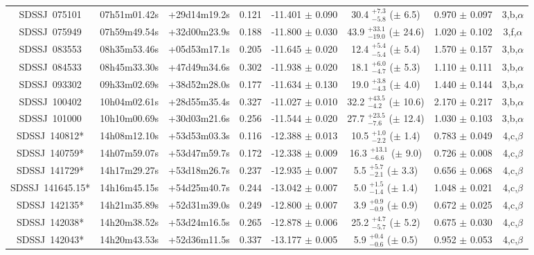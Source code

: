 \documentclass[a4paper,fleqn,usenatbib]{mnras}
\begin{document}
\begin{appendix}
\begin{longtable}{cccccccc}
SDSSJ~075101 & 07h51m01.42s & +29d14m19.2s & 0.121 & -11.401 $\pm$ 0.090 & 30.4 $_{-5.8}^{+7.3}$ ($\pm$ 6.5) &    0.970 $\pm$ 0.097 & 3,b,$\alpha$ \\
SDSSJ~075949 & 07h59m49.54s & +32d00m23.9s & 0.188 & -11.800 $\pm$ 0.030 & 43.9 $_{-19.0}^{+33.1}$ ($\pm$ 24.6) &    1.020 $\pm$ 0.102 & 3,f,$\alpha$ \\
SDSSJ~083553 & 08h35m53.46s & +05d53m17.1s & 0.205 & -11.645 $\pm$ 0.020 & 12.4 $_{-5.4}^{+5.4}$ ($\pm$ 5.4) &    1.570 $\pm$ 0.157 & 3,b,$\alpha$ \\
SDSSJ~084533 & 08h45m33.30s & +47d49m34.6s & 0.302 & -11.938 $\pm$ 0.020 & 18.1 $_{-4.7}^{+6.0}$ ($\pm$ 5.3) &    1.110 $\pm$ 0.111 & 3,b,$\alpha$ \\
SDSSJ~093302 & 09h33m02.69s & +38d52m28.0s & 0.177 & -11.634 $\pm$ 0.130 & 19.0 $_{-4.3}^{+3.8}$ ($\pm$ 4.0) &    1.440 $\pm$ 0.144 & 3,b,$\alpha$ \\
SDSSJ~100402 & 10h04m02.61s & +28d55m35.4s & 0.327 & -11.027 $\pm$ 0.010 & 32.2 $_{-4.2}^{+43.5}$ ($\pm$ 10.6) &    2.170 $\pm$ 0.217 & 3,b,$\alpha$ \\
SDSSJ~101000 & 10h10m00.69s & +30d03m21.6s & 0.256 & -11.544 $\pm$ 0.020 & 27.7 $_{-7.6}^{+23.5}$ ($\pm$ 12.4) &    1.030 $\pm$ 0.103 & 3,b,$\alpha$ \\
SDSSJ~140812* & 14h08m12.10s & +53d53m03.3s & 0.116 & -12.388 $\pm$ 0.013 & 10.5 $_{-2.2}^{+1.0}$ ($\pm$ 1.4) &    0.783 $\pm$ 0.049 & 4,c,$\beta$ \\
SDSSJ~140759* & 14h07m59.07s & +53d47m59.7s & 0.172 & -12.338 $\pm$ 0.009 & 16.3 $_{-6.6}^{+13.1}$ ($\pm$ 9.0) &    0.726 $\pm$ 0.008 & 4,c,$\beta$ \\
SDSSJ~141729* & 14h17m29.27s & +53d18m26.7s & 0.237 & -12.935 $\pm$ 0.007 & 5.5 $_{-2.1}^{+5.7}$ ($\pm$ 3.3) &    0.656 $\pm$ 0.068 & 4,c,$\beta$ \\
SDSSJ~141645.15* & 14h16m45.15s & +54d25m40.7s & 0.244 & -13.042 $\pm$ 0.007 & 5.0 $_{-1.4}^{+1.5}$ ($\pm$ 1.4) &    1.048 $\pm$ 0.021 & 4,c,$\beta$ \\
SDSSJ~142135* & 14h21m35.89s & +52d31m39.0s & 0.249 & -12.800 $\pm$ 0.007 & 3.9 $_{-0.9}^{+0.9}$ ($\pm$ 0.9) &    0.672 $\pm$ 0.025 & 4,c,$\beta$ \\
SDSSJ~142038* & 14h20m38.52s & +53d24m16.5s & 0.265 & -12.878 $\pm$ 0.006 & 25.2 $_{-5.7}^{+4.7}$ ($\pm$ 5.2) &    0.675 $\pm$ 0.030 & 4,c,$\beta$ \\
SDSSJ~142043* & 14h20m43.53s & +52d36m11.5s & 0.337 & -13.177 $\pm$ 0.005 & 5.9 $_{-0.6}^{+0.4}$ ($\pm$ 0.5) &    0.952 $\pm$ 0.053 & 4,c,$\beta$ \\

\end{longtable}
\end{appendix}
\end{document}
